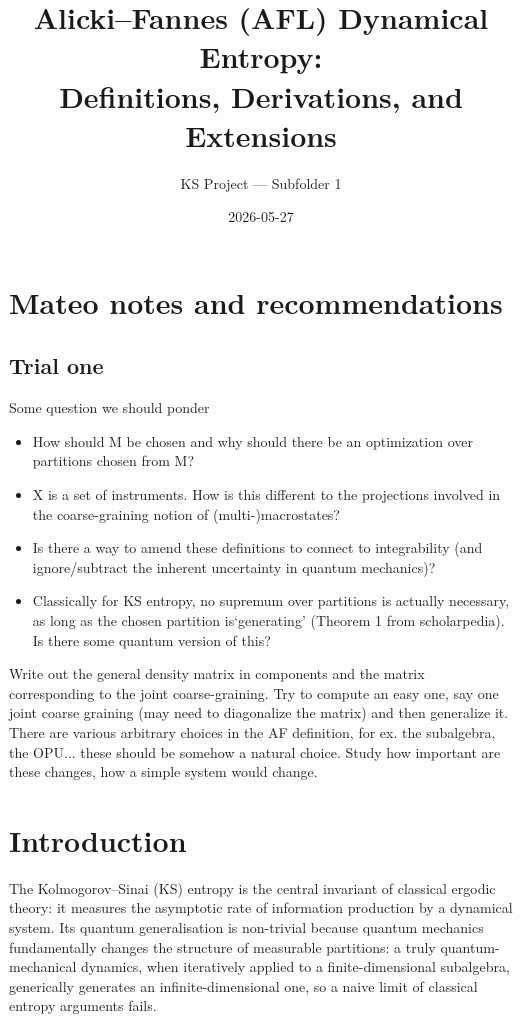 \documentclass[12pt,a4paper]{article}
\title{Alicki--Fannes (AFL) Dynamical Entropy:\\
Definitions, Derivations, and Extensions}
\author{KS Project --- Subfolder 1}
\date{2026-05-27}
\begin{document}
\maketitle
\tableofcontents
\newpage
\section{Mateo notes and recommendations}
\label{sec:notes}
\subsection{Trial one}
Some question we should ponder
\begin{itemize}
    \item How should M be chosen and why should there be an optimization over partitions chosen from M?
    \item X is a set of instruments. How is this different to the projections involved in the coarse-graining notion of (multi-)macrostates?
    \item Is there a way to amend these definitions to connect to integrability (and ignore/subtract the inherent uncertainty in quantum mechanics)?
    \item Classically for KS entropy, no supremum over partitions is actually necessary, as long as the chosen partition is‘generating’ (Theorem 1 from scholarpedia). Is there some quantum version of this?
\end{itemize}
Write out the general density matrix in components and the matrix corresponding to the joint coarse-graining. Try to compute an easy one, say one joint coarse graining (may need to diagonalize the matrix) and then generalize it. \\
There are various arbitrary choices in the AF definition, for ex. the subalgebra, the OPU... these should be somehow a natural choice. Study how important are these changes, how a simple system would change. 
\section{Introduction}

The Kolmogorov--Sinai (KS) entropy is the central invariant of classical ergodic
theory: it measures the asymptotic rate of information production by a dynamical
system.  Its quantum generalisation is non-trivial because quantum mechanics
fundamentally changes the structure of measurable partitions: a truly
quantum-mechanical dynamics, when iteratively applied to a finite-dimensional
subalgebra, generically generates an infinite-dimensional one, so a naive limit
of classical entropy arguments fails.
\end{document}
